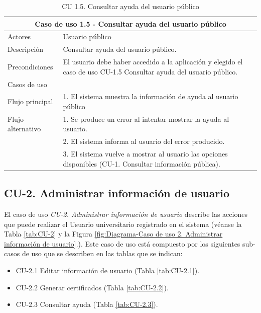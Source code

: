 \begin{table}[H]
\caption{CU 1.5. Consultar ayuda del usuario público}        \label{tab:CU-1.5}
        \begin{center}
            \begin{tabular}{|l|p{12cm}|}
                \hline
                \multicolumn{2}{|c|}{Caso de uso 1.5 - Consultar ayuda del usuario público} \\ \hline \hline
                Actores                 &   Usuario público \\  \hline
                Descripción             &   Consultar ayuda del usuario público. \\  \hline
                Precondiciones          &  El usuario debe haber accedido a la aplicación y elegido el caso de uso CU-1.5 Consultar ayuda del usuario público. \\  \hline
                Casos de uso            &           \\  \hline
                Flujo principal         &   1. El sistema muestra la información de ayuda al usuario público \\ \hline
                Flujo alternativo    &   1. Se produce un error al intentar mostrar la ayuda al usuario. \\
                & 2. El sistema informa al usuario del error producido. \\
                & 3. El sistema vuelve a mostrar al usuario las opciones disponibles (CU-1. Consultar información pública).  \\
                \hline
            \end{tabular}
        \end{center}
    \end{table}

\newpage

\subsection{CU-2. Administrar información de usuario}\label{sec:CU-2}    

El caso de uso \textit{CU-2. Administrar información de usuario} describe las acciones que puede realizar el Usuario universitario registrado en el sistema (véanse la Tabla \ref{tab:CU-2} y la Figura \ref{fig:Diagrama-Caso de uso 2. Administrar información de usuario}.). Este caso de uso está compuesto por los siguientes sub-casos de uso que se describen en las tablas que se indican:
\begin{itemize}
    \item CU-2.1 Editar información de usuario (Tabla \ref{tab:CU-2.1}).
    \item CU-2.2 Generar certificados (Tabla \ref{tab:CU-2.2}).
    \item CU-2.3 Consultar ayuda (Tabla \ref{tab:CU-2.3}).
\end{itemize}

